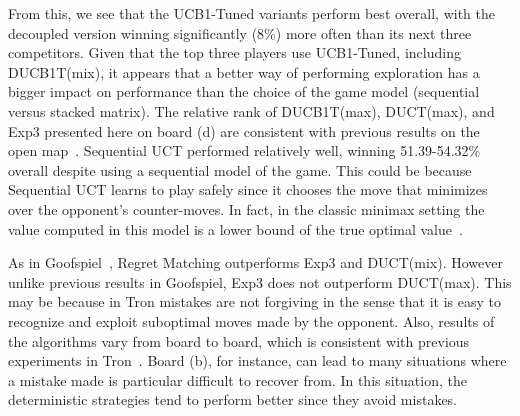 \documentclass{article}
\begin{document}
From this, we see that the UCB1-Tuned variants perform best overall, with the decoupled version 
winning significantly (8\%) more often than its next three competitors. 
Given that the top three players use UCB1-Tuned, including DUCB1T(mix), it appears that a better way of 
performing exploration has a bigger impact on performance than the choice of the game model 
(sequential versus stacked matrix).
The relative rank of DUCB1T(max), DUCT(max), and Exp3 presented here on board (d) are consistent with 
previous results on the open map~\cite{cig_paper}. 
Sequential UCT performed relatively well, winning 51.39-54.32\% overall despite using a 
sequential model of the game. 
This could be because Sequential UCT learns to play safely since it chooses the move that minimizes over
the opponent's counter-moves. In fact, in the classic minimax setting the value computed in this model 
is a lower bound of the true optimal value~\cite{Bosansky13Using}. 

As in Goofspiel~\cite{mcts_goofspiel}, Regret Matching outperforms Exp3 and DUCT(mix). 
However unlike previous results in Goofspiel, Exp3 does not outperform 
DUCT(max). This may be because in Tron mistakes are not forgiving in the sense that it is easy to 
recognize and exploit suboptimal moves made by the opponent. 
Also, results of the algorithms vary from board to board, which is consistent with previous 
experiments in Tron~\cite{teuling_tron}. Board (b), for instance, can lead to many situations where 
a mistake made is particular difficult to recover from. In this situation, the deterministic strategies
tend to perform better since they avoid mistakes. 

\end{document}
